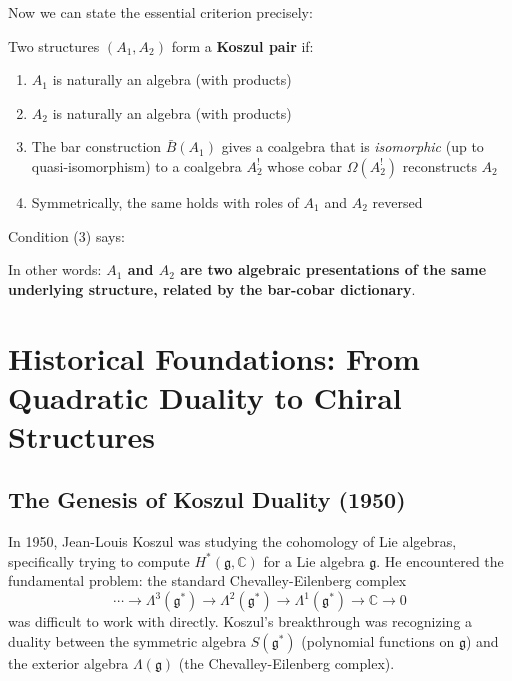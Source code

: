 Now we can state the essential criterion precisely:

\begin{definition}
Two structures $(A_1, A_2)$ form a \textbf{Koszul pair} if:
\begin{enumerate}
\item $A_1$ is naturally an algebra (with products)
\item $A_2$ is naturally an algebra (with products)
\item The bar construction $\bar{B}(A_1)$ gives a coalgebra that is \emph{isomorphic} (up to quasi-isomorphism) to a coalgebra $A_2^!$ whose cobar $\Omega(A_2^!)$ reconstructs $A_2$
\item Symmetrically, the same holds with roles of $A_1$ and $A_2$ reversed
\end{enumerate}
\end{definition}

\begin{remark}
Condition (3) says:
\begin{center}
\end{center}

In other words: \textbf{$A_1$ and $A_2$ are two algebraic presentations of the same underlying structure, related by the bar-cobar dictionary}.
\end{remark}

\section{Historical Foundations: From Quadratic Duality to Chiral Structures}

\subsection{The Genesis of Koszul Duality (1950)}

In 1950, Jean-Louis Koszul was studying the cohomology of Lie algebras, specifically trying to compute $H^*(\mathfrak{g}, \mathbb{C})$ for a Lie algebra $\mathfrak{g}$. He encountered the fundamental problem: the standard Chevalley-Eilenberg complex
\[
\cdots \to \Lambda^3(\mathfrak{g}^*) \to \Lambda^2(\mathfrak{g}^*) \to \Lambda^1(\mathfrak{g}^*) \to \mathbb{C} \to 0
\]
was difficult to work with directly. Koszul's breakthrough was recognizing a duality between the symmetric algebra $S(\mathfrak{g}^*)$ (polynomial functions on $\mathfrak{g}$) and the exterior algebra $\Lambda(\mathfrak{g})$ (the Chevalley-Eilenberg complex).

